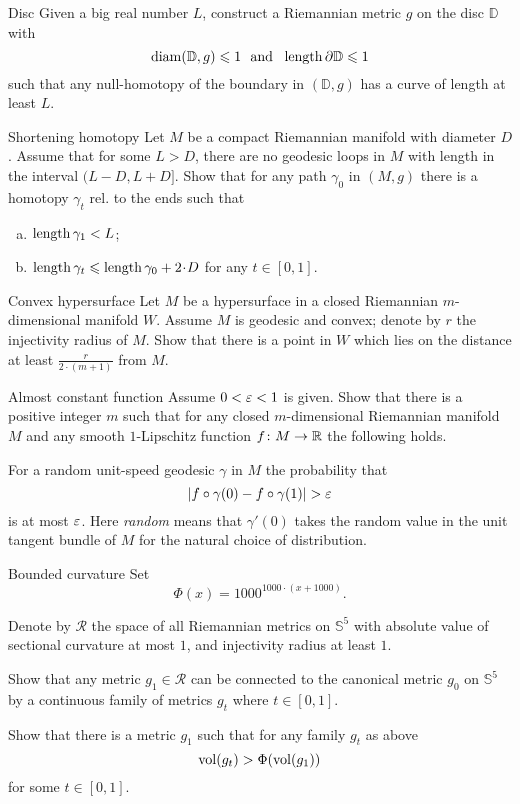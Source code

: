 \documentclass[twoside]{book}
\begin{document}
\begin{pr}{\hard}{Disc}\label{Disc}
Given a big real number $L$,
construct a Riemannian metric $g$ on the disc $\mathbb D$ 
with 
\[\diam(\mathbb D,g)\le 1
\ \ 
\text{and}
\ \ 
\length \partial\mathbb D\le 1  \]
such that any null-homotopy of the boundary in $(\mathbb D,g)$ 
has a curve of length at least $L$.
\end{pr}

\begin{pr}{\thm}{Shortening homotopy}\label{short-homotopy}
Let $M$ be a compact Riemannian manifold with diameter $D$.
Assume that for some $L>D$,
there are no geodesic loops in $M$
with length in the interval $(L-D,L+ D]$.
Show that for any path $\gamma_0$ in $(M,g)$
there is a homotopy $\gamma_t$ rel. to the ends
such that 
\begin{enumerate}[a)]
\item $\operatorname{\rm length} \gamma_1<L$;
\item $\length \gamma_t\le \length \gamma_0+2\cdot D$ for any $t\in[0,1]$.
 
\end{enumerate}
\end{pr}

\begin{pr}{}{Convex hypersurface}\label{Convex hypersurface}
Let $M$ be a hypersurface 
in a closed Riemannian $m$-dimensional manifold $W$.
Assume $M$ is geodesic and convex;
denote by $r$ the injectivity radius of $M$.
Show that there is a point in $W$  which lies on the distance at least  
$\frac{r}{2\cdot(m+1)}$ from $M$.
\end{pr}

\begin{pr}{}{Almost constant function}\label{Almost constant function}
Assume $0<\varepsilon<1$ is given.
Show that there is a positive integer $m$ such that
for any closed $m$-dimensional Riemannian manifold $M$
and any smooth $1$-Lipschitz function $f\:M\z\to\RR$ the following holds.

For a random unit-speed geodesic $\gamma$ in $M$ 
the probability that 
\[|f\circ\gamma(0)-f\circ\gamma(1)|>\eps\]
is at most $\varepsilon$.
Here \emph{random} means that $\gamma'(0)$ takes the random value in the unit tangent bundle of $M$ for the natural choice of distribution.
\end{pr}

\begin{pr}{\thm}{Bounded curvature}\label{Bounded curvature}
Set 
\[\Phi(x)=1000^{1000\cdot (x+1000)}.\]

Denote by $\mathcal{R}$ the space of 
all Riemannian metrics on $\mathbb S^5$
with absolute value of sectional curvature at most $1$,
and injectivity radius at least $1$.

Show that any metric $g_1\in \mathcal{R}$ 
can be connected to the canonical metric $g_0$ on $\mathbb S^5$
by a continuous family of metrics $g_t$ where $t\in[0,1]$.

Show that there is a metric $g_1$ 
such that 
for any family $g_t$ as above
\[\operatorname{\rm vol}(g_t)>\Phi(\operatorname{\rm vol}(g_1))\]
for some $t\in [0,1]$.
\end{pr}
\end{document}
